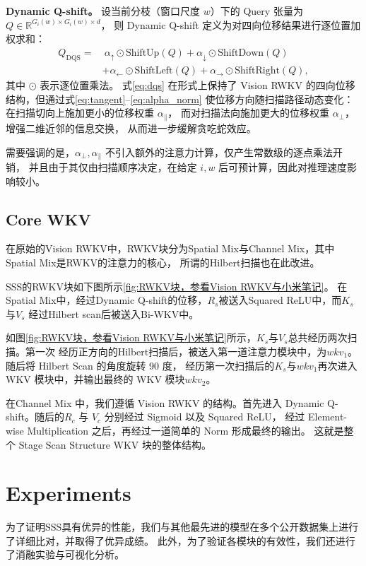 \documentclass[conference]{IEEEtran}   %
\begin{document}
\textbf{Dynamic Q-shift。}
设当前分枝（窗口尺度 $w$）下的 Query 张量为 $Q\in\mathbb{R}^{G_i(w)\times G_i(w)\times d}$，
则 Dynamic Q-shift 定义为对四向位移结果进行逐位置加权求和：
\begin{equation}
\begin{aligned}
Q_{\mathrm{DQS}} = &\ \alpha_{\uparrow}\odot \text{ShiftUp}(Q) + \alpha_{\downarrow}\odot \text{ShiftDown}(Q) \\
& + \alpha_{\leftarrow}\odot \text{ShiftLeft}(Q) + \alpha_{\rightarrow}\odot \text{ShiftRight}(Q),
\end{aligned}
\label{eq:dqs}
\end{equation}
其中 $\odot$ 表示逐位置乘法。
式\ref{eq:dqs} 在形式上保持了 Vision RWKV 的四向位移结构，但通过式\ref{eq:tangent}--\ref{eq:alpha_norm}
使位移方向随扫描路径动态变化：在扫描切向上施加更小的位移权重 $\alpha_{\parallel}$，
而对扫描法向施加更大的位移权重 $\alpha_{\perp}$，增强二维近邻的信息交换，
从而进一步缓解贪吃蛇效应。

需要强调的是，$\alpha_{\perp},\alpha_{\parallel}$ 不引入额外的注意力计算，仅产生常数级的逐点乘法开销，
并且由于其仅由扫描顺序决定，在给定 $i,w$ 后可预计算，因此对推理速度影响较小。

\subsection{Core WKV}
在原始的Vision RWKV中，RWKV块分为Spatial Mix与Channel Mix，其中Spatial Mix是RWKV的注意力的核心，
所谓的Hilbert扫描也在此改进。

SSS的RWKV块如下图所示\ref{fig:RWKV块，参看Vision RWKV与小米笔记}。
在Spatial Mix中，经过Dynamic Q-shift的位移，$R_s$被送入Squared ReLU中，而$K_s$与$V_s$
经过Hilbert scan后被送入Bi-WKV中。

如图\ref{fig:RWKV块，参看Vision RWKV与小米笔记}所示，$K_s$与$V_s$总共经历两次扫描。第一次
经历正方向的Hilbert扫描后，被送入第一道注意力模块中，为$wkv_1$。随后将 Hilbert Scan 的角度旋转 90 度，
经历第一次扫描后的$K_s$与$wkv_1$再次进入 WKV 模块中，并输出最终的 WKV 模块$wkv_2$。

在Channel Mix 中，我们遵循 Vision RWKV 的结构。首先进入 Dynamic Q-shift。随后的$R_c$ 与 $V_c$ 分别经过 Sigmoid 以及 Squared ReLU，
经过 Element-wise Multiplication 之后，再经过一道简单的 Norm 形成最终的输出。
这就是整个 Stage Scan Structure WKV 块的整体结构。



\section{Experiments}
为了证明SSS具有优异的性能，我们与其他最先进的模型在多个公开数据集上进行了详细比对，并取得了优异成绩。
此外，为了验证各模块的有效性，我们还进行了消融实验与可视化分析。
\end{document}
